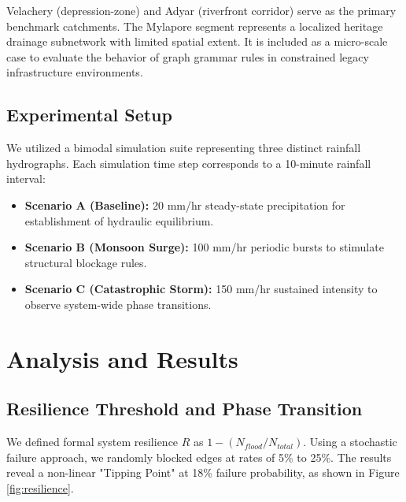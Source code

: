\documentclass[conference]{IEEEtran}
\begin{document}
\begin{table}[htbp]
\caption{Topological Characteristics of Study Areas}
\begin{center}
\label{tab_catchments}
\end{center}
\end{table}
Velachery (depression-zone) and Adyar (riverfront corridor) serve as the primary benchmark catchments. The Mylapore segment represents a localized heritage drainage subnetwork with limited spatial extent. It is included as a micro-scale case to evaluate the behavior of graph grammar rules in constrained legacy infrastructure environments.

\subsection{Experimental Setup}
We utilized a bimodal simulation suite representing three distinct rainfall hydrographs. Each simulation time step corresponds to a 10-minute rainfall interval:
\begin{itemize}
    \item \textbf{Scenario A (Baseline):} 20 mm/hr steady-state precipitation for establishment of hydraulic equilibrium.
    \item \textbf{Scenario B (Monsoon Surge):} 100 mm/hr periodic bursts to stimulate structural blockage rules.
    \item \textbf{Scenario C (Catastrophic Storm):} 150 mm/hr sustained intensity to observe system-wide phase transitions.
\end{itemize}

\section{Analysis and Results}
\subsection{Resilience Threshold and Phase Transition}
We defined formal system resilience $R$ as $1 - (N_{flood}/N_{total})$. Using a stochastic failure approach, we randomly blocked edges at rates of 5\% to 25\%. The results reveal a non-linear "Tipping Point" at 18\% failure probability, as shown in Figure \ref{fig:resilience}.
\end{document}
